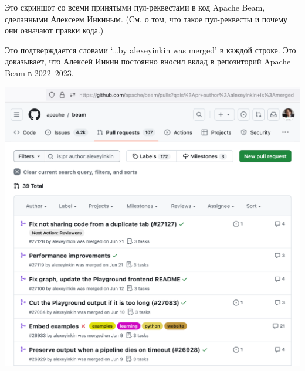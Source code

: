 
Это скриншот со всеми принятыми пул-реквестами в код Apache Beam, сделанными Алексеем Инкиным.
(См.  о том, что такое пул-реквесты и почему они означают правки кода.)

Это подтверждается словами `\dots by alexeyinkin was merged' в каждой строке.
Это доказывает, что Алексей Инкин постоянно вносил вклад в репозиторий Apache Beam в 2022--2023.

\includegraphics[width=\textwidth]{github-prs-alexeyinkin-p1}
\WillContinue

\pagebreak

